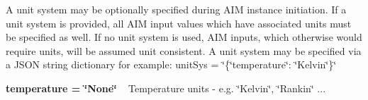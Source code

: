 A unit system may be optionally specified during AIM instance initiation. If a unit system is provided, all AIM input values which have associated units must be specified as well. If no unit system is used, AIM inputs, which otherwise would require units, will be assumed unit consistent. A unit system may be specified via a JSON string dictionary for example\+: unit\+Sys = \char`\"{}\{\char`\"{}temperature\char`\"{}\+: \char`\"{}Kelvin\char`\"{}\}\char`\"{}


\begin{DoxyItemize}
\item {\bfseries{temperature = \char`\"{}\+None\char`\"{}}}  ~\newline
 Temperature units -\/ e.\+g. \char`\"{}\+Kelvin\char`\"{}, \char`\"{}\+Rankin\char`\"{} ... 
\end{DoxyItemize}